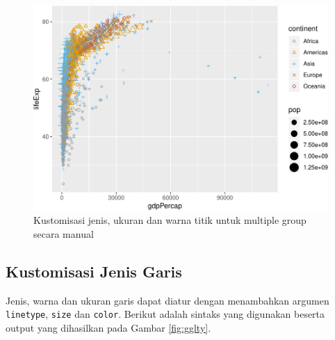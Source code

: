 \documentclass[]{book}
\newenvironment{Shaded}{\begin{snugshade}}{\end{snugshade}}
\newcommand{\KeywordTok}[1]{\textcolor[rgb]{0.13,0.29,0.53}{\textbf{#1}}}
\newcommand{\DataTypeTok}[1]{\textcolor[rgb]{0.13,0.29,0.53}{#1}}
\newcommand{\DecValTok}[1]{\textcolor[rgb]{0.00,0.00,0.81}{#1}}
\newcommand{\StringTok}[1]{\textcolor[rgb]{0.31,0.60,0.02}{#1}}
\newcommand{\CommentTok}[1]{\textcolor[rgb]{0.56,0.35,0.01}{\textit{#1}}}
\newcommand{\OperatorTok}[1]{\textcolor[rgb]{0.81,0.36,0.00}{\textbf{#1}}}
\newcommand{\NormalTok}[1]{#1}
\begin{document}
\begin{figure}

{\centering \includegraphics[width=0.7\linewidth]{EnvStat_files/figure-latex/ggpoint3-1} 

}

\caption{Kustomisasi jenis, ukuran dan warna titik untuk multiple group secara manual}\label{fig:ggpoint3}
\end{figure}

\subsection{Kustomisasi Jenis Garis}\label{kustomisasi-jenis-garis}

Jenis, warna dan ukuran garis dapat diatur dengan menambahkan argumen
\texttt{linetype}, \texttt{size} dan \texttt{color}. Berikut adalah
sintaks yang digunakan beserta output yang dihasilkan pada Gambar
\ref{fig:gglty}.

\begin{Shaded}
\end{Shaded}
\end{document}
